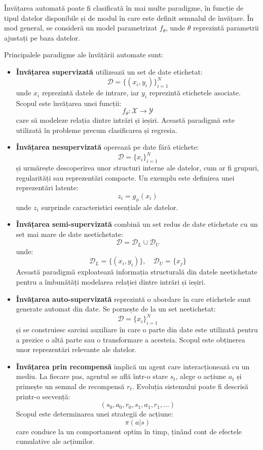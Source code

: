 Învățarea automată poate fi clasificată în mai multe paradigme, în funcție de tipul datelor disponibile și de modul în care este definit semnalul de învățare. În mod general, se consideră un model parametrizat \( f_\theta \), unde \( \theta \) reprezintă parametrii ajustați pe baza datelor.

Principalele paradigme ale învățării automate sunt:

\begin{itemize}
    \item \textbf{Învățarea supervizată} utilizează un set de date etichetat:
    \[
        \mathcal{D} = \{(x_i, y_i)\}_{i=1}^{N}
    \]
    unde \( x_i \) reprezintă datele de intrare, iar \( y_i \) reprezintă etichetele asociate. Scopul este învățarea unei funcții:
    \[
        f_\theta : \mathcal{X} \rightarrow \mathcal{Y}
    \]
    care să modeleze relația dintre intrări și ieșiri. Această paradigmă este utilizată în probleme precum clasificarea și regresia.

    \item \textbf{Învățarea nesupervizată} operează pe date fără etichete:
    \[
        \mathcal{D} = \{x_i\}_{i=1}^{N}
    \]
    și urmărește descoperirea unor structuri interne ale datelor, cum ar fi grupuri, regularități sau reprezentări compacte. Un exemplu este definirea unei reprezentări latente:
    \[
        z_i = g_\phi(x_i)
    \]
    unde \( z_i \) surprinde caracteristici esențiale ale datelor.

    \item \textbf{Învățarea semi-supervizată} combină un set redus de date etichetate cu un set mai mare de date neetichetate:
    \[
        \mathcal{D} = \mathcal{D}_L \cup \mathcal{D}_U
    \]
    unde:
    \[
        \mathcal{D}_L = \{(x_i, y_i)\}, \quad
        \mathcal{D}_U = \{x_j\}
    \]
    Această paradigmă exploatează informația structurală din datele neetichetate pentru a îmbunătăți modelarea relației dintre intrări și ieșiri.

    \item \textbf{Învățarea auto-supervizată} reprezintă o abordare în care etichetele sunt generate automat din date. Se pornește de la un set neetichetat:
    \[
        \mathcal{D} = \{x_i\}_{i=1}^{N}
    \]
    și se construiesc sarcini auxiliare în care o parte din date este utilizată pentru a prezice o altă parte sau o transformare a acesteia. Scopul este obținerea unor reprezentări relevante ale datelor.

    \item \textbf{Învățarea prin recompensă} implică un agent care interacționează cu un mediu. La fiecare pas, agentul se află într-o stare \( s_t \), alege o acțiune \( a_t \) și primește un semnal de recompensă \( r_t \). Evoluția sistemului poate fi descrisă printr-o secvență:
    \[
        (s_0, a_0, r_0, s_1, a_1, r_1, \ldots)
    \]
    Scopul este determinarea unei strategii de acțiune:
    \[
        \pi(a|s)
    \]
    care conduce la un comportament optim în timp, ținând cont de efectele cumulative ale acțiunilor.
\end{itemize}

